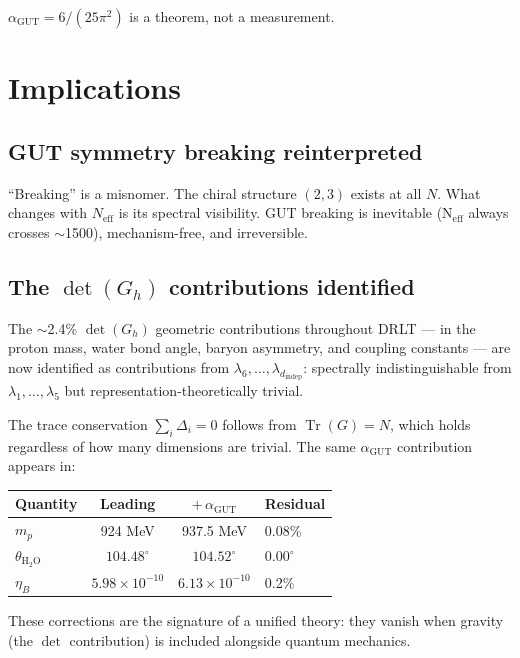 \documentclass[12pt]{article}
\theoremstyle{remark}
\begin{document}
{$\alpha_\text{GUT} = 6/(25\pi^2)$ is a theorem, not a measurement.

\section{Implications}

\subsection{GUT symmetry breaking reinterpreted}

``Breaking'' is a misnomer. The chiral structure $(2,3)$ exists at all $N$. What changes with $N_\text{eff}$ is its spectral visibility. GUT breaking is inevitable (N$_\text{eff}$ always crosses $\sim$1500), mechanism-free, and irreversible.

\subsection{The $\det(G_h)$ contributions identified}

The $\sim$2.4\% $\det(G_h)$ geometric contributions throughout DRLT --- in the proton mass, water bond angle, baryon asymmetry, and coupling constants --- are now identified as contributions from $\lambda_6, \ldots, \lambda_{d_\text{indep}}$: spectrally indistinguishable from $\lambda_1, \ldots, \lambda_5$ but representation-theoretically trivial.

The trace conservation $\sum_i \Delta_i = 0$ follows from $\operatorname{Tr}(G) = N$, which holds regardless of how many dimensions are trivial. The same $\alpha_\text{GUT}$ contribution appears in:

\begin{center}
\begin{tabular}{lccl}
\hline
Quantity & Leading & $+\,\alpha_\text{GUT}$ & Residual \\
\hline
$m_p$ & 924 MeV & 937.5 MeV & 0.08\% \\
$\theta_{\text{H}_2\text{O}}$ & $104.48^\circ$ & $104.52^\circ$ & $0.00^\circ$ \\
$\eta_B$ & $5.98 \times 10^{-10}$ & $6.13 \times 10^{-10}$ & 0.2\% \\
\hline
\end{tabular}
\end{center}

These corrections are the signature of a unified theory: they vanish when gravity (the $\det$ contribution) is included alongside quantum mechanics.

}
\end{document}
